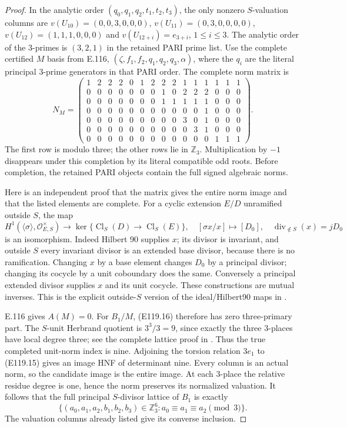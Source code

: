 \begin{proof}
In the analytic order $(q_0,q_1,q_2,t_1,t_2,t_3)$,
the only nonzero $S$-valuation columns are
$v(U_{10})=(0,0,3,0,0,0)$,
$v(U_{11})=(0,3,0,0,0,0)$,
$v(U_{12})=(1,1,1,0,0,0)$ and
$v(U_{12+i})=e_{3+i}$, $1\leq i\leq3$.
The analytic order of the $3$-primes is $(3,2,1)$ in the
retained PARI prime list.
Use the complete certified $M$ basis from E.116,
$(\zeta,f_1,f_2,q_1,q_2,q_3,\alpha)$, where the $q_i$
are the literal principal $3$-prime generators in that
PARI order. The complete norm matrix is
\[
 N_M=\left(\begin{array}{*{15}{r}}
 1&2&2&2&0&1&2&2&2&1&1&1&1&1&1\\
 0&0&0&0&0&0&0&1&0&2&2&2&0&0&0\\
 0&0&0&0&0&0&0&1&1&1&1&1&0&0&0\\
 0&0&0&0&0&0&0&0&0&0&0&1&0&0&0\\
 0&0&0&0&0&0&0&0&0&3&0&1&0&0&0\\
 0&0&0&0&0&0&0&0&0&0&3&1&0&0&0\\
 0&0&0&0&0&0&0&0&0&0&0&0&1&1&1
 \end{array}\right).
 \tag{E119.15}
\]
The first row is modulo three; the other rows lie in
$\mathbb Z_3$. Multiplication by $-1$ disappears under this
completion by its literal compatible odd roots. Before completion,
the retained PARI objects contain the full signed algebraic norms.

Here is an independent proof that the matrix gives the entire
norm image and that the listed elements are complete.
For a cyclic extension $E/D$ unramified outside $S$, the map
\[
 H^1(\langle\sigma\rangle,\mathcal O_{E,S}^{\times})
 \longrightarrow\ker\{\operatorname{Cl}_S(D)\to
                         \operatorname{Cl}_S(E)\},
 \quad [\sigma x/x]\longmapsto[D_0],\quad
 \operatorname{div}_{\notin S}(x)=jD_0
 \tag{E119.16}
\]
is an isomorphism. Indeed Hilbert 90 supplies $x$; its divisor
is invariant, and outside $S$ every invariant divisor is an
extended base divisor, because there is no ramification.
Changing $x$ by a base element changes $D_0$ by a principal
divisor; changing its cocycle by a unit coboundary does the same.
Conversely a principal extended divisor supplies $x$ and its
unit cocycle. These constructions are mutual inverses.
This is the explicit outside-$S$ version of the ideal/Hilbert90
maps in \cite[Proposition1 and full ideal proof]{E_LemmermeyerAmbiguous}.

E.116 gives $A(M)=0$. For $B_1/M$, (E119.16) therefore has
zero three-primary part. The $S$-unit Herbrand quotient is
$3^3/3=9$, since exactly the three $3$-places have local degree
three; see the complete lattice proof in
\cite[VII,Proposition3.1]{E_MilneCFT}.
Thus the true completed unit-norm index is nine.
Adjoining the torsion relation $3e_1$ to (E119.15) gives
an image HNF of determinant nine. Every column is an actual
norm, so the candidate image is the entire image.
At each $3$-place the relative residue degree is one, hence
the norm preserves its normalized valuation. It follows that
the full principal $S$-divisor lattice of $B_1$ is exactly
\[
 \{(a_0,a_1,a_2,b_1,b_2,b_3)\in\mathbb Z_3^6:
                    a_0\equiv a_1\equiv a_2\pmod3\}.
 \tag{E119.17}
\]
The valuation columns already listed give its converse inclusion.


\end{proof}
